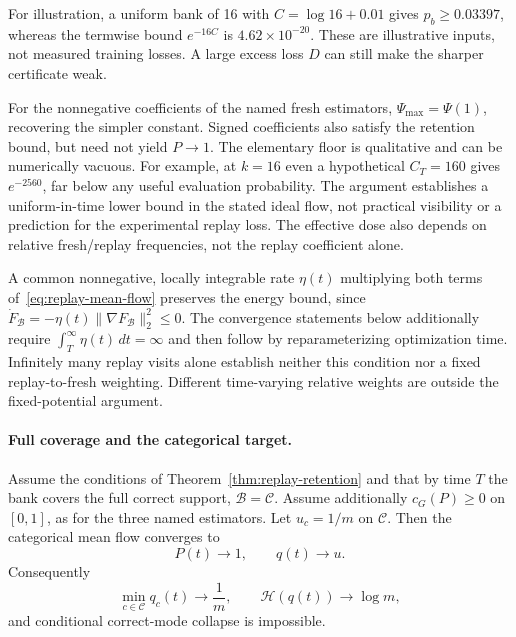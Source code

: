 For illustration, a uniform bank of 16 with $C=\log16+0.01$ gives
$p_b\ge0.03397$, whereas the termwise bound $e^{-16C}$ is
$4.62\times10^{-20}$. These are illustrative inputs, not measured training
losses. A large excess loss $D$ can still make the sharper certificate weak.



For the nonnegative coefficients of the named fresh estimators,
$\Psi_{\max}=\Psi(1)$, recovering the simpler constant. Signed coefficients
also satisfy the retention bound, but need not yield $P\to1$.
The elementary floor is qualitative and can be numerically vacuous. For example, at
$k=16$ even a hypothetical $C_T=160$ gives $e^{-2560}$, far below any useful
evaluation probability. The argument establishes a uniform-in-time lower
bound in the stated ideal flow, not practical visibility or a prediction for
the experimental replay loss. The effective dose also depends on relative
fresh/replay frequencies, not the replay coefficient alone.

A common nonnegative, locally integrable rate $\eta(t)$ multiplying both
terms of~\eqref{eq:replay-mean-flow} preserves the energy bound, since
$\dot F_{\mathcal B}=-\eta(t)\|\nabla F_{\mathcal B}\|_2^2\le0$.
The convergence statements below additionally require
$\int_T^\infty\eta(t)\,dt=\infty$ and then follow by reparameterizing
optimization time. Infinitely many replay visits alone establish neither
this condition nor a fixed replay-to-fresh weighting. Different time-varying
relative weights are outside the fixed-potential argument.

\paragraph{Full coverage and the categorical target.}
\begin{corollary}
\enforcehalffinalproseline
\label{cor:replay-no-collapse}
Assume the conditions of Theorem~\ref{thm:replay-retention} and that by time
$T$ the bank covers the full correct support, $\mathcal B=\mathcal C$.
Assume additionally $c_G(P)\ge0$ on $[0,1]$, as for the three named
estimators. Let
$u_c=1/m$ on $\mathcal C$. Then the categorical mean flow converges to
\[
  P(t)\longrightarrow1,
  \qquad q(t)\longrightarrow u.
\]
Consequently
\[
  \min_{c\in\mathcal C}q_c(t)\longrightarrow\frac1m,
  \qquad
  \mathcal H(q(t))\longrightarrow\log m,
\]
and conditional correct-mode collapse is impossible.
\end{corollary}

